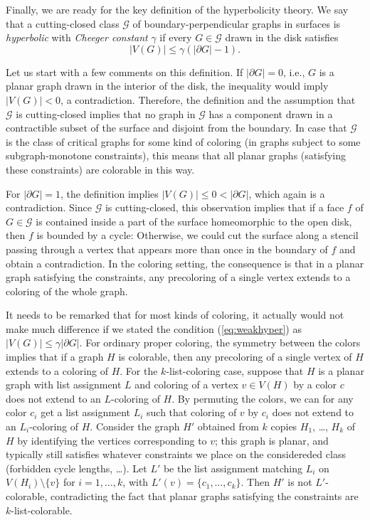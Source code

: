 \documentclass[12pt,twoside,openright,a4paper]{book}
\newcommand{\GG}{\mathcal{G}}
\begin{document}
Finally, we are ready for the key definition of the hyperbolicity theory.
We say that a cutting-closed class $\GG$ of boundary-perpendicular graphs in surfaces is \emph{hyperbolic} with \emph{Cheeger constant} $\gamma$
if every $G\in\GG$ drawn in the disk satisfies
\begin{equation}\label{eq:weakhyper}
|V(G)|\le \gamma(|\partial G|-1).
\end{equation}

Let us start with a few comments on this definition.  If $|\partial G|=0$, i.e., $G$ is a planar graph drawn in the interior
of the disk, the inequality would imply $|V(G)|<0$, a contradiction.  Therefore, the definition and the assumption that
$\GG$ is cutting-closed implies that no graph in $\GG$ has a component drawn in a contractible subset of the surface and disjoint
from the boundary.  In case that $\GG$ is the class of critical graphs for some kind of coloring (in graphs subject to some
subgraph-monotone constraints), this means that all planar graphs (satisfying these constraints) are colorable in this way.

For $|\partial G|=1$, the definition implies $|V(G)|\le 0<|\partial G|$, which again is a contradiction.
Since $\GG$ is cutting-closed, this observation implies that if a face $f$ of $G\in\GG$ is contained inside a part of the surface
homeomorphic to the open disk, then $f$ is bounded by a cycle: Otherwise, we could cut the surface along a stencil
passing through a vertex that appears more than once in the boundary of $f$ and obtain a contradiction.
In the coloring setting, the consequence is that in a planar graph satisfying the constraints, any precoloring of a single
vertex extends to a coloring of the whole graph.

It needs to be remarked that for most kinds of coloring, it actually would not make much difference if
we stated the condition (\ref{eq:weakhyper}) as $|V(G)|\le \gamma|\partial G|$.  For ordinary proper coloring, the symmetry between the colors
implies that if a graph $H$ is colorable, then any precoloring of a single vertex of $H$ extends to a coloring of $H$.
For the $k$-list-coloring case, suppose that $H$ is a planar graph with list assignment $L$ and coloring of a vertex $v\in V(H)$
by a color $c$ does not extend to an $L$-coloring of $H$.  By permuting the colors, we can for any color $c_i$ get a list assignment $L_i$
such that coloring of $v$ by $c_i$ does not extend to an $L_i$-coloring of $H$.  Consider the graph $H'$ obtained from
$k$ copies $H_1$, \ldots, $H_k$ of $H$ by identifying the vertices corresponding to $v$; this graph is planar, and typically
still satisfies whatever constraints we place on the considereded class (forbidden cycle lengths, \ldots).
Let $L'$ be the list assignment matching $L_i$ on $V(H_i)\setminus \{v\}$ for $i=1,\ldots, k$, with $L'(v)=\{c_1,\ldots, c_k\}$.
Then $H'$ is not $L'$-colorable, contradicting the fact that planar graphs satisfying the constraints are $k$-list-colorable.
\end{document}
